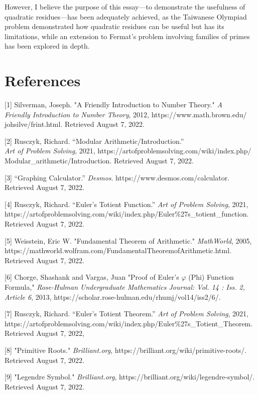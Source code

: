 \documentclass{article}
\newcommand{\p}{\varphi}
\begin{document}
However, I believe the purpose of this essay---to demonstrate the usefulness of quadratic residues---has been adequately achieved, as the Taiwanese Olympiad problem demonstrated how quadratic residues can be useful but has its limitations, while an extension to Fermat's problem involving families of primes has been explored in depth.
\newpage

\section{References}
[1] Silverman, Joseph. "A Friendly Introduction to Number Theory." \textit{A \\ Friendly Introduction to Number Theory}, 2012,  https://www.math.brown.edu/\\ johsilve/frint.html. Retrieved August 7, 2022.

[2] Rusczyk, Richard. “Modular Arithmetic/Introduction.” \\ \textit{Art of Problem Solving}, 2021, https://artofproblemsolving.com/wiki/index.php/\\ Modular\_arithmetic/Introduction. Retrieved August 7, 2022.

[3] “Graphing Calculator.” \textit{Desmos}. https://www.desmos.com/calculator. Retrieved August 7, 2022.

[4] Rusczyk, Richard. “Euler's Totient Function.” \textit{Art of Problem Solving}, 2021, \\ https://artofproblemsolving.com/wiki/index.php/Euler\%27s\_totient\_function. \\ Retrieved August 7, 2022.

[5] Weisstein, Eric W. "Fundamental Theorem of Arithmetic." \textit{MathWorld}, 2005, https://mathworld.wolfram.com/FundamentalTheoremofArithmetic.html. Retrieved August 7, 2022.

[6] Chorge, Shashank and Vargas, Juan "Proof of Euler's $\p$ (Phi) Function Formula," \textit{Rose-Hulman
Undergraduate Mathematics Journal: Vol. 14 : Iss. 2, Article 6}, 2013, https://scholar.rose-hulman.edu/rhumj/vol14/iss2/6/.

[7] Rusczyk, Richard. “Euler's Totient Theorem.” \textit{Art of Problem Solving}, 2021, https://artofproblemsolving.com/wiki/index.php/Euler\%27s\_Totient\_Theorem. Retrieved August 7, 2022,

[8] "Primitive Roots." \textit{Brilliant.org},  https://brilliant.org/wiki/primitive-roots/. Retrieved August 7, 2022.

[9] "Legendre Symbol." \textit{Brilliant.org}, https://brilliant.org/wiki/legendre-symbol/. Retrieved August 7, 2022.
\end{document}
